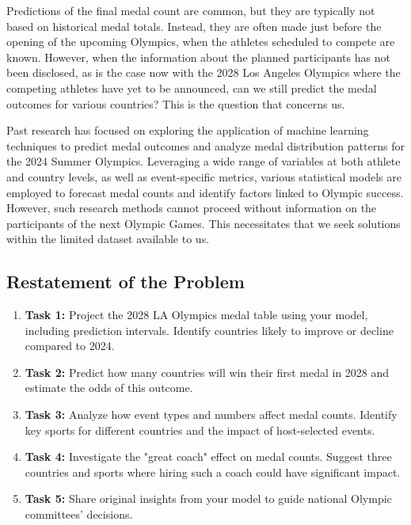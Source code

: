 \documentclass[12pt]{article}  %
\begin{document}
Predictions of the final medal count are common, but they are typically not based on historical medal totals. Instead, they are often made just before the opening of the upcoming Olympics, when the athletes scheduled to compete are known\cite{1}. However, when the information about the planned participants has not been disclosed, as is the case now with the 2028 Los Angeles Olympics where the competing athletes have yet to be announced, can we still predict the medal outcomes for various countries? This is the question that concerns us.

Past research has focused on exploring the application of machine learning techniques to predict medal outcomes and analyze medal distribution patterns for the 2024 Summer Olympics\cite{2}. Leveraging a wide range of variables at both athlete and country levels, as well as event-specific metrics, various statistical models are employed to forecast medal counts and identify factors linked to Olympic success. However, such research methods cannot proceed without information on the participants of the next Olympic Games. This necessitates that we seek solutions within the limited dataset available to us.

\subsection{Restatement of the Problem}

\begin{enumerate}[\textbullet]
    \item \textbf{Task 1:} Project the 2028 LA Olympics medal table using your model, including prediction intervals. Identify countries likely to improve or decline compared to 2024.
    \item \textbf{Task 2:} Predict how many countries will win their first medal in 2028 and estimate the odds of this outcome.
    \item \textbf{Task 3:} Analyze how event types and numbers affect medal counts. Identify key sports for different countries and the impact of host-selected events.
    \item \textbf{Task 4:} Investigate the "great coach" effect on medal counts. Suggest three countries and sports where hiring such a coach could have significant impact.
    \item \textbf{Task 5:} Share original insights from your model to guide national Olympic committees' decisions.
\end{enumerate}
\end{document}

